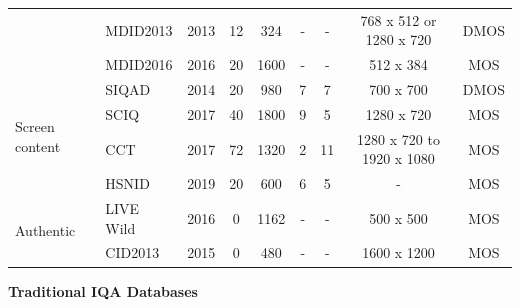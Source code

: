 \begin{table}[!t]
{\begin{tabular}{p{1.8cm} p{2cm} c c c c c c c}
        & MDID2013 \cite{MDID2013} & 2013 & 12 & 324 & - & - & 768 x 512 or 1280 x 720 & DMOS \\
        & MDID2016 \cite{MDID2016} & 2016 & 20 & 1600 & - & - & 512 x 384 & MOS \\
        \hline
        \multirow{4}{*}{Screen content} 
        & SIQAD \cite{SIQAD} & 2014 & 20 & 980 & 7 & 7 & 700 x 700 & DMOS \\
        & SCIQ \cite{SCIQ} & 2017 & 40 & 1800 & 9 & 5 & 1280 x 720 & MOS \\
        & CCT \cite{CCT} & 2017 & 72 & 1320 & 2 & 11 & 1280 x 720 to 1920 x 1080 & MOS \\
        & HSNID \cite{HSNID} & 2019 & 20 & 600 & 6 & 5 &  - & MOS \\
        \hline
        \multirow{2}{*}{Authentic} 
        & LIVE Wild \cite{LIVEWild} & 2016 & 0 & 1162 & - & - & 500 x 500 & MOS \\
        & CID2013 \cite{CID2013} & 2015 & 0 & 480 & - & - & 1600 x 1200 & MOS \\
    \bottomrule
    \end{tabular}
    }
\end{table}
\vspace{\baselineskip}
\textbf{Traditional IQA Databases}

